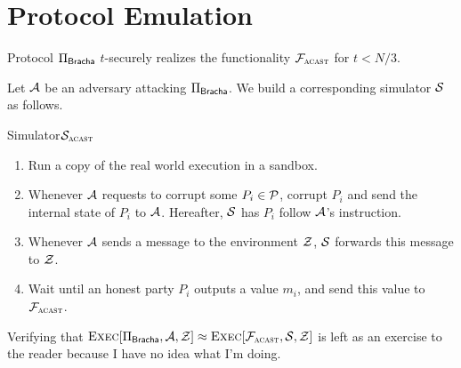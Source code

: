 \documentclass{llncs}
\begin{document}
\section{Protocol Emulation}

\begin{theorem}
Protocol $\Pi_{\sf Bracha}$ $t$-securely realizes the functionality $\mathcal{{F}}_{\textsc{acast}}$
for $t < N/3$.
\end{theorem}

\begin{proof-sketch}
Let $\mathcal{{A}}$ be an adversary attacking $\Pi_{\sf Bracha}$. We build a
corresponding simulator $\mathcal{{S}}$ as follows.

\begin{boxdef}{Simulator}{$\mathcal{{S}}_{\textsc{acast}}$}
\begin{enumerate}
  \item Run a copy of the real world execution in a sandbox.
  \item Whenever $\mathcal{{A}}$ requests to corrupt some $P_i \in \mathcal{{P}}$, corrupt $P_i$
  and send the internal state of $P_i$ to $\mathcal{{A}}$. Hereafter, $\mathcal{{S}}$ has
  $P_i$ follow $\mathcal{{A}}$'s instruction.
  \item Whenever $\mathcal{{A}}$ sends a message to the environment $\mathcal{{Z}}$, $\mathcal{{S}}$
  forwards this message to $\mathcal{{Z}}$.
  \item Wait until an honest party $P_i$ outputs a value $m_i$, and send this
  value to $\mathcal{{F}}_{\textsc{acast}}$.
\end{enumerate}
\end{boxdef}

\begin{comment}
\noindent If an honest party $P_i$ outputs $m_i$, then in the ideal execution, $P_s$
sent $m_i$ to $\Func{acast}$.
if $P_i$ accepts nothing, then no party output
then $\mc{S}$ instructed $P_s$ to send $m_i \neq m$ to $\Func{acast}$. The
correctness of $\Pi_{\sf Bracha}$~\cite{bracha1987asynchronous} implies that $P_i$
accepts nothing only when $P_s$ is actively corrupted. Verifying that
$\textsc{Exec}[\Pi_{\sf
Bracha}, \mc{A}, \mc{Z}] \approx \textsc{Exec}[\Func{acast}, \mc{S}, \mc{Z}]$ is left
as an exercise to the reader because I have no idea what I'm doing.
\end{comment}

\noindent Verifying that $\textsc{Exec}[\Pi_{\sf
Bracha}, \mathcal{{A}}, \mathcal{{Z}}] \approx \textsc{Exec}[\mathcal{{F}}_{\textsc{acast}}, \mathcal{{S}}, \mathcal{{Z}}]$ is left
as an exercise to the reader because I have no idea what I'm doing.
\end{proof-sketch}
    


\end{document}
